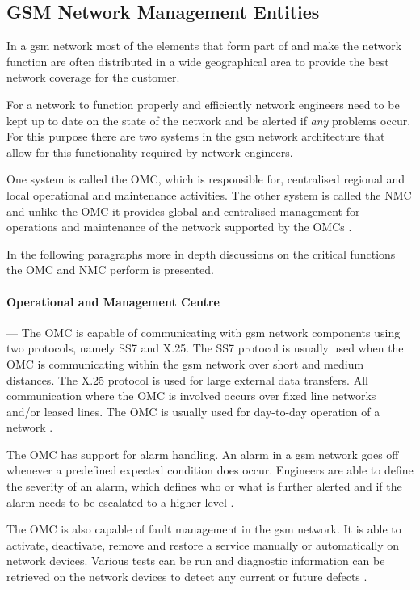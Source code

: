 \subsection{GSM Network Management Entities}
In a \gls{gsm} network most of the elements that form part of and make the network function are often distributed in a wide geographical area to provide the best network coverage for the customer\cite{GSMSysEngin}. 

For a network to function properly and efficiently network engineers need to be kept up to date on the state of the network and be alerted if \emph{any} problems occur\cite{GSMSysEngin}. For this purpose there are two systems in the \gls{gsm} network architecture that allow for this functionality required by network engineers\cite{GSMSysEngin}. 

One system is called the \gls{OMC}, which is responsible for, centralised regional and local operational and maintenance activities\cite{GSMSysEngin}. The other system is called the \gls{NMC} and unlike the \gls{OMC} it provides global and centralised management for operations and maintenance of the network supported by the OMCs \cite{GSMSysEngin}.

In the following paragraphs more in depth discussions on the critical functions the \gls{OMC} and \gls{NMC} perform is presented.

\paragraph{Operational and Management Centre}
--- The \gls{OMC} is capable of communicating with \gls{gsm} network components using two protocols, namely SS7 and X.25\cite{GSMSysEngin}. The SS7 protocol is usually used when the \gls{OMC} is communicating within the \gls{gsm} network over short and medium distances\cite{GSMSysEngin}. The X.25 protocol is used for large external data transfers\cite{GSMSysEngin}. All communication where the \gls{OMC} is involved occurs over fixed line networks and/or leased lines. The \gls{OMC} is usually used for day-to-day operation of a network \cite{GSMSysEngin}.

The \gls{OMC} has support for alarm handling\cite{GSMSysEngin}. An alarm in a \gls{gsm} network goes off whenever a predefined expected condition does occur. Engineers are able to define the severity of an alarm, which defines who or what is further alerted and if the alarm needs to be escalated to a higher level \cite{GSMSysEngin}.

The \gls{OMC} is also capable of fault management in the \gls{gsm} network\cite{GSMSysEngin}. It is able to activate, deactivate, remove and restore a service manually or automatically on network devices\cite{GSM92}. Various tests can be run and diagnostic information can be retrieved on the network devices to detect any current or future defects \cite{GSMSysEngin}.

